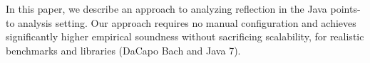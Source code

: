 In this paper, we describe an approach to analyzing reflection in the
Java points-to analysis setting.
%
%
Our approach requires no manual configuration and achieves
significantly higher empirical soundness without sacrificing
scalability, for realistic benchmarks and libraries (DaCapo Bach and
Java 7).
%
%
